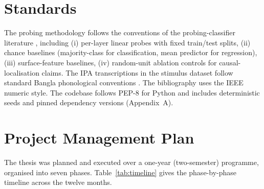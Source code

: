 \section{Standards}

The probing methodology follows the conventions of the probing-classifier literature \cite{conneau2018probing,belinkov2022probing,pimentel2020information}, including (i) per-layer linear probes with fixed train/test splits, (ii) chance baselines (majority-class for classification, mean predictor for regression), (iii) surface-feature baselines, (iv) random-unit ablation controls for causal-localisation claims. The IPA transcriptions in the stimulus dataset follow standard Bangla phonological conventions \cite{nag2014dyslexia}. The bibliography uses the IEEE numeric style. The codebase follows PEP-8 for Python and includes deterministic seeds and pinned dependency versions (Appendix~A).

\section{Project Management Plan}

The thesis was planned and executed over a one-year (two-semester) programme, organised into seven phases. Table~\ref{tab:timeline} gives the phase-by-phase timeline across the twelve months.

\begin{table}[H]
\centering
\caption{One-year thesis timeline. Phases overlap at their boundaries; writing runs in parallel with the final analysis phases.}
\label{tab:timeline}
\small
{}
\end{table}

